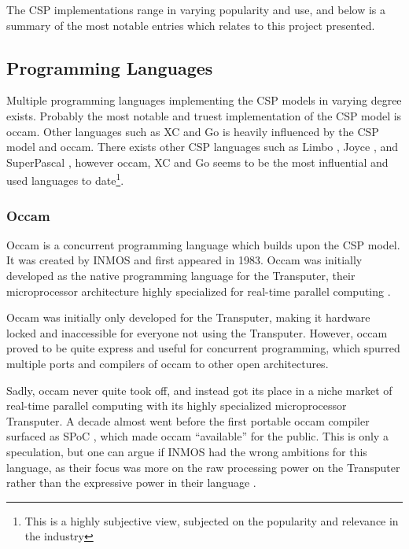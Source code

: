 The CSP implementations range in varying popularity and use, and below is a summary of the most notable entries which relates to this project presented.


\subsection{Programming Languages}
\label{subsec:csp_prog_lang}

Multiple programming languages implementing the CSP models in varying degree exists. Probably the most notable and truest implementation of the CSP model is occam. Other languages such as XC and Go is heavily influenced by the CSP model and occam. There exists other CSP languages such as Limbo \citep{limbo}, Joyce \citep{joyce}, and SuperPascal \citep{superpascal}, however occam, XC and Go seems to be the most influential and used languages to date\footnote{This is a highly subjective view, subjected on the popularity and relevance in the industry}. 


\subsubsection{Occam}
\label{sssec:occam}

Occam is a concurrent programming language which builds upon the CSP model. It was created by INMOS \citep{occam} and first appeared in 1983. Occam was initially developed as the native programming language for the Transputer, their microprocessor architecture highly specialized for real-time parallel computing \citep{transputer}. 

Occam was initially only developed for the Transputer, making it hardware locked and inaccessible for everyone not using the Transputer. However, occam proved to be quite express and useful for concurrent programming, which spurred multiple ports and compilers of occam to other open architectures. 

Sadly, occam never quite took off, and instead got its place in a niche market of real-time parallel computing with its highly specialized microprocessor Transputer. A decade almost went before the first portable occam compiler surfaced as SPoC \citep{spoc}, which made occam ``available'' for the public. This is only a speculation, but one can argue if INMOS had the wrong ambitions for this language, as their focus was more on the raw processing power on the Transputer rather than the expressive power in their language \citep{occam}. 

